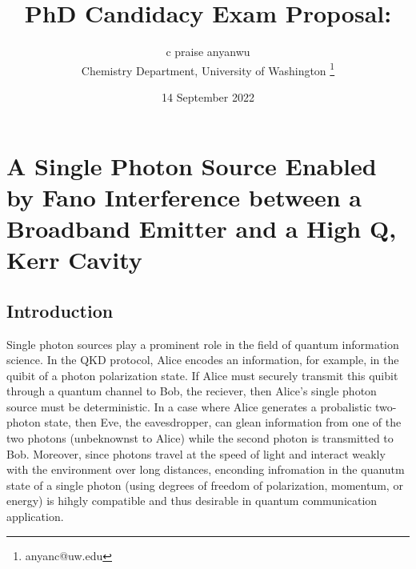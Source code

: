 \documentclass[12pt]{article}
\begin{document}
\title{PhD Candidacy Exam Proposal:}
\author{c praise anyanwu \\
    Chemistry Department, University of Washington
    \thanks{anyanc@uw.edu} }
\date{14 September 2022}
\maketitle

\newpage
\section{A Single Photon Source Enabled by Fano Interference between a
Broadband Emitter and a High Q, Kerr Cavity}

\subsection{Introduction}
Single photon sources play a prominent role in the field of quantum information 
science. \cite{gisin2002quantum, bennett2004quantum} In the QKD protocol, Alice encodes 
an information, for example, in the quibit of a photon polarization state. If Alice must 
securely transmit this quibit through a quantum channel to Bob, the reciever, then 
Alice's single photon source must be deterministic. In a case where Alice generates a 
probalistic two-photon state, then Eve, the eavesdropper, can glean information from one 
of the two photons (unbeknownst to Alice) while the second photon is transmitted to Bob. 
\cite{bennett1984proceedings, bennett1992quantum} Moreover, since photons travel at the 
speed of light and interact weakly with the environment over long distances, enconding 
infromation in the quanutm state of a single photon (using degrees of freedom of 
polarization, momentum, or energy) is hihgly compatible and thus desirable in 
quantum communication application.
\end{document}
